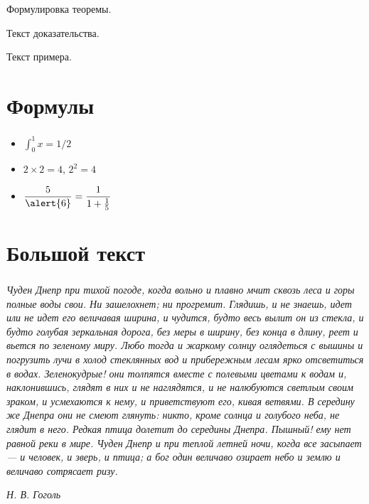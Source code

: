 \documentclass[t]{beamer}  %
\begin{document}
\begin{frame}
\frametitle{\insertsection}
\framesubtitle{\insertsubsection}
\begin{rtheorem}
Формулировка теоремы.    
\end{rtheorem}
\begin{rproof}
Текст доказательства.
\end{rproof}
\begin{rexample}
Текст примера.
\end{rexample}
\end{frame}

\section{Формулы}

\begin{frame}
\frametitle{\insertsection}
\begin{itemize}
\item $\displaystyle\int_0^1 x=1/2$  
\item $2\times 2=4$, $2^2=4$ 
\item $\displaystyle\frac{5}{\alert{6}}=\frac{1}{1+\frac{1}{5}}$ 
\end{itemize}
\end{frame}

\section{Большой текст}

\begin{frame}[shrink=7]\label{lab}  %
\frametitle{\insertsection}
\textsl{Чуден Днепр при тихой погоде, когда вольно и плавно мчит сквозь леса и горы полные воды свои. Ни зашелохнет; ни прогремит. Глядишь, и не знаешь, идет или не идет его величавая ширина, и чудится, будто весь вылит он из стекла, и будто голубая зеркальная дорога, без меры в ширину, без конца в длину, реет и вьется по зеленому миру. Любо тогда и жаркому солнцу оглядеться с вышины и погрузить лучи в холод стеклянных вод и прибережным лесам ярко отсветиться в водах. Зеленокудрые! они толпятся вместе с полевыми цветами к водам и, наклонившись, глядят в них и не наглядятся, и не налюбуются светлым  своим зраком, и усмехаются к нему, и приветствуют его, кивая ветвями. В середину же Днепра они не смеют глянуть: никто, кроме солнца и голубого неба, не глядит в него. Редкая птица долетит до середины Днепра. Пышный! ему нет равной реки в мире. Чуден Днепр и при теплой летней ночи, когда все засыпает --- и человек, и зверь, и птица; а бог один величаво озирает небо и землю и величаво сотрясает ризу.}

\hfill{\textit{Н. В. Гоголь}}
\end{frame}
\end{document}
